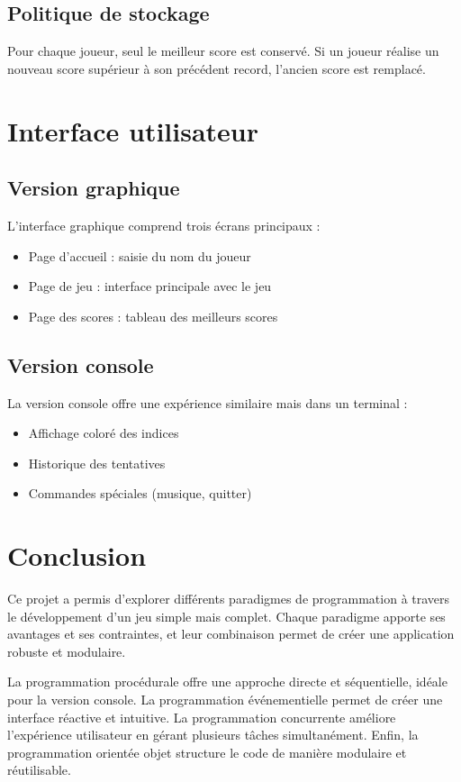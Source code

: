 \documentclass{article}
\begin{document}
\subsection{Politique de stockage}
Pour chaque joueur, seul le meilleur score est conservé. Si un joueur réalise un nouveau score supérieur à son précédent record, l'ancien score est remplacé.

\section{Interface utilisateur}

\subsection{Version graphique}
L'interface graphique comprend trois écrans principaux :
\begin{itemize}
    \item Page d'accueil : saisie du nom du joueur
    \item Page de jeu : interface principale avec le jeu
    \item Page des scores : tableau des meilleurs scores
\end{itemize}

\subsection{Version console}
La version console offre une expérience similaire mais dans un terminal :
\begin{itemize}
    \item Affichage coloré des indices
    \item Historique des tentatives
    \item Commandes spéciales (musique, quitter)
\end{itemize}



\section{Conclusion}

Ce projet a permis d'explorer différents paradigmes de programmation à travers le développement d'un jeu simple mais complet. Chaque paradigme apporte ses avantages et ses contraintes, et leur combinaison permet de créer une application robuste et modulaire.

La programmation procédurale offre une approche directe et séquentielle, idéale pour la version console. La programmation événementielle permet de créer une interface réactive et intuitive. La programmation concurrente améliore l'expérience utilisateur en gérant plusieurs tâches simultanément. Enfin, la programmation orientée objet structure le code de manière modulaire et réutilisable.
\end{document}
